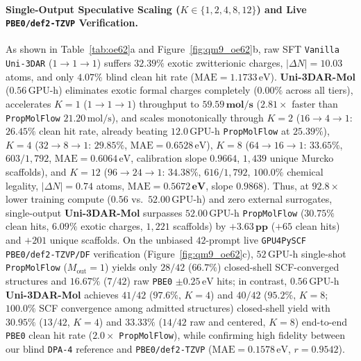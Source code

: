 \documentclass[11pt,a4paper]{article}
\begin{document}
\paragraph{Single-Output Speculative Scaling ($K \in \{1, 2, 4, 8, 12\}$) and Live \texttt{PBE0/def2-TZVP} Verification.}
As shown in Table~\ref{tab:oe62}a and Figure~\ref{fig:qm9_oe62}b, raw SFT \texttt{Vanilla Uni-3DAR} ($1\to 1\to 1$) suffers $32.39\%$ exotic zwitterionic charges, $|\Delta N| = 10.03$ atoms, and only $4.07\%$ blind clean hit rate ($\text{MAE} = 1.1733\,\text{eV}$). \textbf{Uni-3DAR-Mol} ($0.56\,\text{GPU-h}$) eliminates exotic formal charges completely ($\mathbf{0.00\%}$ across all tiers), accelerates $K=1$ ($1\to 1\to 1$) throughput to $\mathbf{59.59\,\text{mol/s}}$ ($2.81\times$ faster than \texttt{PropMolFlow} $21.20\,\text{mol/s}$), and scales monotonically through $K=2$ ($16\to 4\to 1$: $\mathbf{26.45\%}$ clean hit rate, already beating $12.0\,\text{GPU-h}$ \texttt{PropMolFlow} at $25.39\%$), $K=4$ ($32\to 8\to 1$: $29.85\%$, $\text{MAE}=0.6528\,\text{eV}$), $K=8$ ($64\to 16\to 1$: $\mathbf{33.65\%}$, $603/1{,}792$, $\text{MAE}=0.6064\,\text{eV}$, calibration slope $0.9664$, $1{,}439$ unique Murcko scaffolds), and $K=12$ ($96\to 24\to 1$: $\mathbf{34.38\%}$, $616/1{,}792$, $\mathbf{100.0\%}$ chemical legality, $|\Delta N|=\mathbf{0.74}$ atoms, $\text{MAE}=\mathbf{0.5672\,\text{eV}}$, slope $\mathbf{0.9868}$). Thus, at $\mathbf{92.8\times}$ lower training compute ($0.56$ vs.\ $52.00\,\text{GPU-h}$) and zero external surrogates, single-output \textbf{Uni-3DAR-Mol} surpasses $52.00\,\text{GPU-h}$ \texttt{PropMolFlow} ($30.75\%$ clean hits, $6.09\%$ exotic charges, $1{,}221$ scaffolds) by $\mathbf{+3.63\,\text{pp}}$ ($+65$ clean hits) and $+201$ unique scaffolds. On the unbiased $42$-prompt live \texttt{GPU4PySCF PBE0/def2-TZVP/DF} verification (Figure~\ref{fig:qm9_oe62}c), $52\,\text{GPU-h}$ single-shot \texttt{PropMolFlow} ($M_{\text{out}}=1$) yields only $28/42$ ($66.7\%$) closed-shell SCF-converged structures and $16.67\%$ ($7/42$) raw \texttt{PBE0} $\pm 0.25\,\text{eV}$ hits; in contrast, $0.56\,\text{GPU-h}$ \textbf{Uni-3DAR-Mol} achieves $41/42$ ($97.6\%$, $K=4$) and $40/42$ ($95.2\%$, $K=8$; $100.0\%$ SCF convergence among admitted structures) closed-shell yield with $\mathbf{30.95\%}$ ($13/42$, $K=4$) and $\mathbf{33.33\%}$ ($14/42$ raw and centered, $K=8$) end-to-end \texttt{PBE0} clean hit rate ($\mathbf{2.0\times}$ \texttt{PropMolFlow}), while confirming high fidelity between our blind \texttt{DPA-4} reference and \texttt{PBE0/def2-TZVP} ($\text{MAE}=0.1578\,\text{eV}$, $r=0.9542$).
\end{document}
